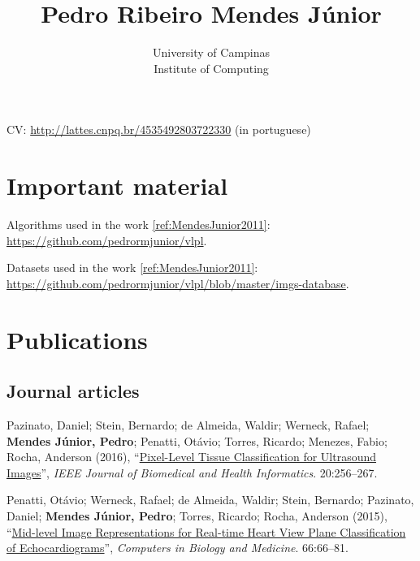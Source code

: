 \documentclass{article}
\title{Pedro Ribeiro Mendes J{\'u}nior}
\author{University of Campinas\\Institute of Computing}
\newcommand{\myurl}[1]{\href{#1}{#1}}
\newcommand{\ifnotempty}[2]{\ifthenelse{\equal{#1}{}}{}{#2}}
\newcommand{\journal}[9]{\label{#1} #2 (#3), ``\href{#4}{#5}'', \emph{#6}. #7\ifnotempty{#8}{(#8)}:#9.}
\begin{document}
\nocite{Penatti2015}
\nocite{Pazinato2015}
\nocite{MendesJunior2011}

\maketitle

CV: \myurl{http://lattes.cnpq.br/4535492803722330} (in portuguese)


\section*{Important material}
\label{sec:important-material}

Algorithms used in the work \ref{ref:MendesJunior2011}: \myurl{https://github.com/pedrormjunior/vlpl}.

Datasets used in the work \ref{ref:MendesJunior2011}: \myurl{https://github.com/pedrormjunior/vlpl/blob/master/imgs-database}.

\section*{Publications}

\subsection*{Journal articles}

\begin{enumerate}[label={[\arabic*]}]
\item\journal{ref:Pazinato2016}
  {Pazinato, Daniel; Stein, Bernardo; de Almeida, Waldir; Werneck, Rafael; \textbf{Mendes Júnior, Pedro}; Penatti, Otávio; Torres, Ricardo; Menezes, Fabio; Rocha, Anderson}
  {2016}
  {http://dx.doi.org/10.1109/JBHI.2014.2386796}
  {Pixel-Level Tissue Classification for Ultrasound Images}
  {IEEE Journal of Biomedical and Health Informatics}
  {20}
  {1}
  {256--267}
\item\journal{ref:Penatti2015}
  {Penatti, Otávio; Werneck, Rafael; de Almeida, Waldir; Stein, Bernardo; Pazinato, Daniel; \textbf{Mendes Júnior, Pedro}; Torres, Ricardo; Rocha, Anderson}
  {2015}
  {http://dx.doi.org/10.1016/j.compbiomed.2015.08.004}
  {Mid-level Image Representations for Real-time Heart View Plane Classification of Echocardiograms}
  {Computers in Biology and Medicine}
  {66}
  {}
  {66--81}
\end{enumerate}
\end{document}
